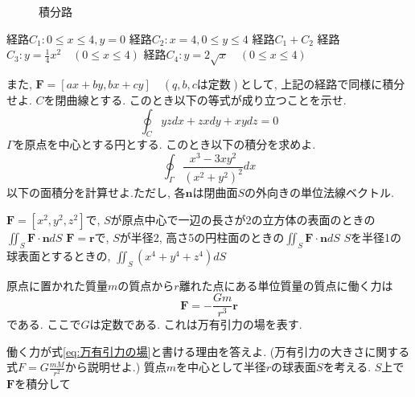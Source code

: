 \documentclass[a4j,dvipdfmx]{jsarticle}
\begin{document}
\begin{qparts}
\begin{figure}[h]
                \caption{積分路}\label{積分路}
            \end{figure}
            \begin{qlist}
                \qitem 経路$C_1:0\leq x\leq 4,y=0$
                \qitem 経路$C_2:x=4,0\leq y\leq 4$
                \qitem 経路$C_1+C_2$
                \qitem 経路$C_3:\displaystyle y=\frac{1}{4}x^2\quad (0\leq x\leq 4)$
                \qitem 経路$C_4:\displaystyle y=2\sqrt{x} \quad (0\leq x\leq 4)$
            \end{qlist}
            また, $\bm{F}=[ax+by,bx+cy]\quad(q,b,c\text{は定数})$として, 上記の経路で同様に積分せよ.
        \qpart $C$を閉曲線とする. このとき以下の等式が成り立つことを示せ.
            \begin{equation*}
                \oint_C yzdx+zxdy+xydz = 0
            \end{equation*}
        \qpart $\Gamma$を原点を中心とする円とする. このとき以下の積分を求めよ.
            \begin{equation*}
                \oint_\Gamma \frac{x^3-3xy^2}{(x^2+y^2)^2}dx
            \end{equation*}
        \qpart 以下の面積分を計算せよ.ただし, 各$\bm{n}$は閉曲面$S$の外向きの単位法線ベクトル.
            \begin{qlist}
                \qitem $\bm{F}=[x^2,y^2,z^2]$で, $S$が原点中心で一辺の長さが2の立方体の表面のときの$\displaystyle \iint_S \bm{F}\cdot\bm{n}dS$
                \qitem $\bm{F}=\bm{r}$で, $S$が半径2, 高さ5の円柱面のときの$\displaystyle \iint_S\bm{F}\cdot\bm{n}dS$
                \qitem $S$を半径1の球表面とするときの, $\displaystyle\iint_S (x^4+y^4+z^4)dS$
            \end{qlist}
        \qpart 原点に置かれた質量$m$の質点から$r$離れた点にある単位質量の質点に働く力は
            \begin{equation}
                \bm{F}=-\frac{Gm}{r^3}\bm{r} \label{eq:万有引力の場}        
            \end{equation}
            である. ここで$G$は定数である. これは万有引力の場を表す.
            \begin{qlist}
                \qitem 働く力が式\eqref{eq:万有引力の場}と書ける理由を答えよ. (万有引力の大きさに関する式$F=G\frac{mM}{r^2}$から説明せよ.)
                \qitem 質点$m$を中心として半径$r$の球表面$S$を考える. $S$上で$\bm{F}$を積分して

\end{qlist}
\end{qparts}
\end{document}

